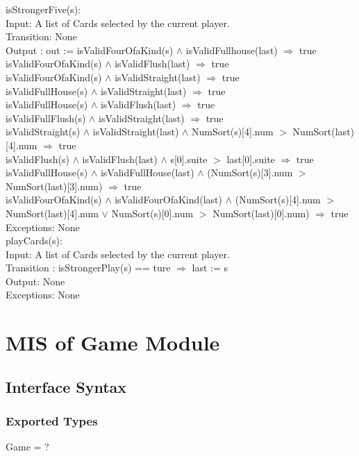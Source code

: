 \documentclass[12pt, titlepage]{article}
\begin{document}
\noindent isStrongerFive(s):\\
Input: A list of Cards selected by the current player.\\
Transition: None\\
Output : out := isValidFourOfaKind(s) $\land$ isValidFullhouse(last) $\Rightarrow$ true\\
isValidFourOfaKind(s) $\land$ isValidFlush(last) $\Rightarrow$ true\\
isValidFourOfaKind(s) $\land$ isValidStraight(last) $\Rightarrow$ true\\
isValidFullHouse(s) $\land$ isValidStraight(last) $\Rightarrow$ true\\
isValidFullHouse(s) $\land$ isValidFlush(last) $\Rightarrow$ true\\
isValidFullFlush(s) $\land$ isValidStraight(last) $\Rightarrow$ true\\
isValidStraight(s) $\land$ isValidStraight(last) $\land$ NumSort(s)[4].num $>$ NumSort(last)[4].num $\Rightarrow$ true\\
isValidFlush(s) $\land$ isValidFlush(last) $\land$ s[0].suite $>$ last[0].suite $\Rightarrow$ true\\
isValidFullHouse(s) $\land$ isValidFullHouse(last) $\land$ (NumSort(s)[3].num $>$ NumSort(last)[3].num) $\Rightarrow$ true\\
isValidFourOfaKind(s) $\land$ isValidFourOfaKind(last) $\land$ (NumSort(s)[4].num $>$ NumSort(last)[4].num $\lor$ NumSort(s)[0].num $>$ NumSort(last)[0].num) $\Rightarrow$ true\\
Exceptions: None\\

\noindent playCards(s):\\
Input:  A list of Cards selected by the current player.\\
Transition : isStrongerPlay(s) == ture $\Rightarrow$ last := s\\
Output: None \\
Exceptions: None \\

\section{MIS of Game Module}
\subsection{Interface Syntax}
\subsubsection{Exported Types}
Game = ?
\end{document}
